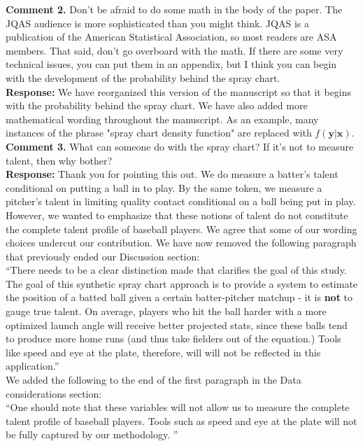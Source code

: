 \documentclass[12pt]{article}
\newcommand{\y}{\textbf{y}}
\newcommand{\x}{\textbf{x}}
\begin{document}
\noindent\textbf{Comment 2.} Don’t be afraid to do some math in the body of the paper. The JQAS audience is more sophisticated than you might think. JQAS is a publication of the American Statistical Association, so most readers are ASA members. That said, don’t go overboard with the math. If there are some very technical issues, you can put them in an appendix, but I think you can begin with the development of the probability behind the spray chart. \\


\noindent\textbf{Response:} We have reorganized this version of the manuscript so that it begins with the probability behind the spray chart. We have also added more mathematical wording throughout the manuscript. As an example, many instances of the phrase "spray chart density function" are replaced with $f(\y|\x)$.  \\

\noindent\textbf{Comment 3.} What can someone do with the spray chart? If it’s not to measure talent, then why bother? \\

\noindent\textbf{Response:} Thank you for pointing this out. We do measure a batter's talent conditional on putting a ball in to play. By the same token, we measure a pitcher's talent in limiting quality contact conditional on a ball being put in play. However, we wanted to emphasize that these notions of talent do not constitute the complete talent profile of baseball players. We agree that some of our wording choices undercut our contribution. We have now removed the following paragraph that previously ended our Discussion section: \\

``There needs to be a clear distinction made that clarifies the goal of this study. The goal of this synthetic spray chart approach is to provide a system to estimate the position of a batted ball given a certain batter-pitcher matchup - it is \textbf{not} to gauge true talent. On average, players who hit the ball harder with a more optimized launch angle will receive better projected stats, since these balls tend to produce more home runs (and thus take fielders out of the equation.) Tools like speed and eye at the plate, therefore, will will not be reflected in this application.'' \\

\noindent We added the following to the end of the first paragraph in the Data considerations section: \\

``One should note that these variables will not allow us to measure the complete talent profile of baseball players. %
Tools such as speed and eye at the plate will not be fully captured by our methodology.
''
	
\end{document}
